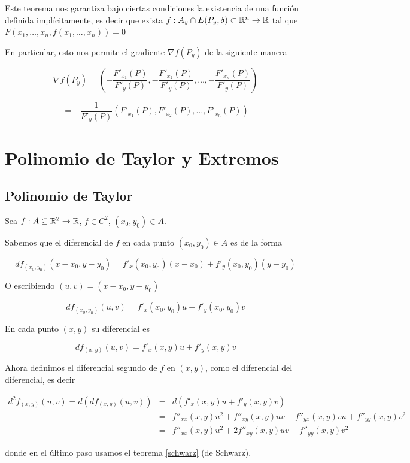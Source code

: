 Este teorema nos garantiza bajo ciertas condiciones la existencia de una función definida implícitamente, es decir que exista $ f : A_y \cap E(P_y, \delta) \subset \mathbb{R}^n \to \mathbb{R}$ tal que $F(x_1, \ldots, x_n, f(x_1, \ldots, x_n)) = 0$

En particular, esto nos permite el gradiente $ \nabla f(P_y)$ de la siguiente manera

$$ \nabla f(P_y) = \left( - \frac{F'_{x_1}(P)}{F'_y(P)}, - \frac{F'_{x_2}(P)}{F'_y(P)}, \ldots, - \frac{F'_{x_n}(P)}{F'_y(P)} \right) $$

$$ = - \frac{1}{F'_y(P)} \left( F'_{x_1}(P), F'_{x_2}(P), \ldots, F'_{x_n}(P) \right) $$


\chapter{Polinomio de Taylor y Extremos}

\section{Polinomio de Taylor}

Sea $f: A \subseteq \mathbb{R}^2 \to \mathbb{R}$, $f \in C^2$, $(x_0, y_0) \in A$.

Sabemos que el diferencial de $f$ en cada punto $(x_0, y_0) \in A$ es de la forma

$$ df_{(x_0,y_0)}(x-x_0, y-y_0) = f'_x(x_0,y_0) (x-x_0) + f'_y(x_0,y_0) (y-y_0) $$

O escribiendo $(u,v) = (x-x_0, y-y_0)$

$$ df_{(x_0,y_0)}(u,v) = f'_x(x_0,y_0)u + f'_y(x_0,y_0)v $$

En cada punto $(x,y)$ su diferencial es

$$ df_{(x,y)}(u,v) = f'_x(x,y)u + f'_y(x,y)v $$

Ahora definimos el diferencial segundo de $f$ en $(x,y)$, como el diferencial del diferencial, es decir

\begin{eqnarray*} d^2 f_{(x,y)}(u,v) = d( df_{(x,y)}(u,v) ) &=& d( f'_x(x,y)u + f'_y(x,y)v ) \\ 
&=& f''_{xx}(x,y)u^2 + f''_{xy}(x,y)uv + f''_{yx}(x,y)vu + f''_{yy}(x,y)v^2 \\
&=& f''_{xx}(x,y)u^2 + 2 f''_{xy}(x,y)uv + f''_{yy}(x,y)v^2 \end{eqnarray*}

donde en el último paso usamos el teorema \ref{schwarz} (de Schwarz).

